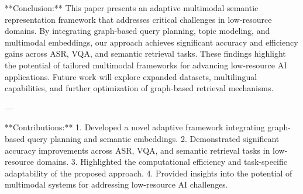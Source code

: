 **Conclusion:**  
This paper presents an adaptive multimodal semantic representation framework that addresses critical challenges in low-resource domains. By integrating graph-based query planning, topic modeling, and multimodal embeddings, our approach achieves significant accuracy and efficiency gains across ASR, VQA, and semantic retrieval tasks. These findings highlight the potential of tailored multimodal frameworks for advancing low-resource AI applications. Future work will explore expanded datasets, multilingual capabilities, and further optimization of graph-based retrieval mechanisms.  

---

**Contributions:**  
1. Developed a novel adaptive framework integrating graph-based query planning and semantic embeddings.  
2. Demonstrated significant accuracy improvements across ASR, VQA, and semantic retrieval tasks in low-resource domains.  
3. Highlighted the computational efficiency and task-specific adaptability of the proposed approach.  
4. Provided insights into the potential of multimodal systems for addressing low-resource AI challenges.  
